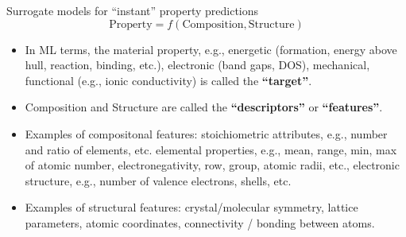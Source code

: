 \documentclass[aspectratio=169]{beamer}
\begin{document}
    \begin{frame}{Surrogate models for “instant” property predictions}
        \begin{equation*}
            \mathrm{Property} = f(\mathrm{Composition}, \mathrm{Structure})
        \end{equation*}
        \begin{itemize}
            \item In ML terms, the material property, e.g., energetic (formation, energy above hull, reaction, binding, etc.), electronic (band gaps, DOS), mechanical, functional (e.g., ionic conductivity) is called the \textbf{``target''}.
            \item Composition and Structure are called the \textbf{``descriptors''} or \textbf{``features''}.
            \item Examples of compositonal features: stoichiometric attributes, e.g., number and ratio of elements, etc. elemental properties, e.g., mean, range, min, max of atomic number, electronegativity, row, group, atomic radii, etc., electronic structure, e.g., number of valence electrons, shells, etc.
            \item Examples of structural features: crystal/molecular symmetry, lattice parameters, atomic coordinates, connectivity / bonding between atoms.
        \end{itemize}
    \end{frame}
\end{document}
